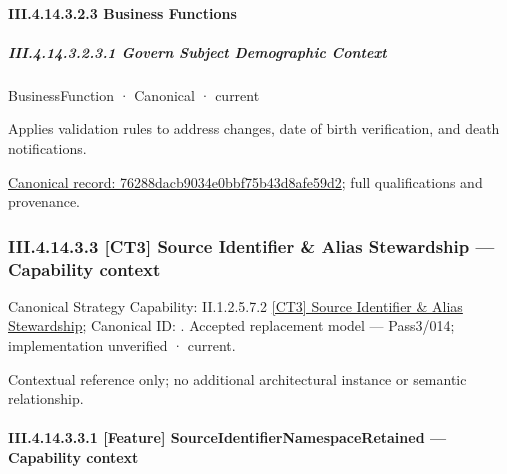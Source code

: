\paragraph*{III.4.14.3.2.3 Business Functions}
\label{navigation:III.4.14.3.2.3}

\subparagraph*{III.4.14.3.2.3.1 Govern Subject Demographic Context}
\label{navigation:III.4.14.3.2.3.1}

\label{element:76288dacb9034e0bbf75b43d8afe59d2}
{\small BusinessFunction · Canonical · current}\par

Applies validation rules to address changes, date of birth verification, and death notifications.


{\footnotesize \href{../../../../../../../continuum/business/business-function/76288dacb9034e0bbf75b43d8afe59d2.md}{Canonical record: 76288dacb9034e0bbf75b43d8afe59d2}; full qualifications and provenance.}\par
\subsubsection*{III.4.14.3.3 [CT3] Source Identifier \& Alias Stewardship — Capability context}
\label{navigation:III.4.14.3.3}

{\small Canonical Strategy Capability: II.1.2.5.7.2 \hyperref[element:d928bd4033a84a5e9fde8ec88e31bbd6]{[CT3] Source Identifier \& Alias Stewardship}; Canonical ID: \texttt{}. Accepted replacement model — Pass3/014; implementation unverified · current.}\par
Contextual reference only; no additional architectural instance or semantic relationship.\par
\paragraph*{III.4.14.3.3.1 [Feature] SourceIdentifierNamespaceRetained — Capability context}
\label{navigation:III.4.14.3.3.1}

